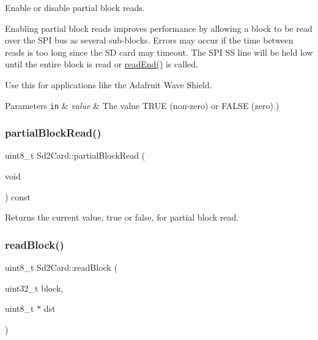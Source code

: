 Enable or disable partial block reads.

Enabling partial block reads improves performance by allowing a block to be read over the S\+PI bus as several sub-\/blocks. Errors may occur if the time between reads is too long since the SD card may timeout. The S\+PI SS line will be held low until the entire block is read or \hyperlink{class_sd2_card_a0de961537d051bbcafd87ed9fff5fe48}{read\+End()} is called.

Use this for applications like the Adafruit Wave Shield.


\begin{DoxyParams}[1]{Parameters}
\mbox{\tt in}  & {\em value} & The value T\+R\+UE (non-\/zero) or F\+A\+L\+SE (zero).) \\
\hline
\end{DoxyParams}
\mbox{\label{class_sd2_card_af3de0f1fdfc86816f45b555841ff291b}} 
\subsubsection{\texorpdfstring{partial\+Block\+Read()}{partialBlockRead()}\hspace{0.1cm}{\footnotesize\ttfamily [2/2]}}
{\footnotesize\ttfamily uint8\+\_\+t Sd2\+Card\+::partial\+Block\+Read (\begin{DoxyParamCaption}\item[{void}]{ }\end{DoxyParamCaption}) const\hspace{0.3cm}{\ttfamily [inline]}}

Returns the current value, true or false, for partial block read. \mbox{\label{class_sd2_card_ae26d840449a42d45af464fb81b92e2ab}} 
\subsubsection{\texorpdfstring{read\+Block()}{readBlock()}}
{\footnotesize\ttfamily uint8\+\_\+t Sd2\+Card\+::read\+Block (\begin{DoxyParamCaption}\item[{uint32\+\_\+t}]{block,  }\item[{uint8\+\_\+t $\ast$}]{dst }\end{DoxyParamCaption})}

